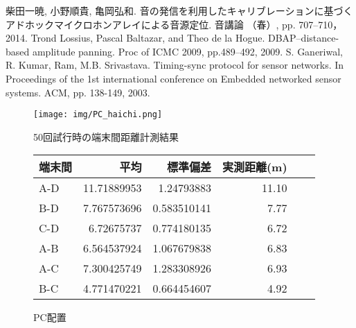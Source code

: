 \documentclass[11pt]{jarticle}
\makeatletter
\newcommand{\tblcaption}[1]{\def\@captype{table}\caption{#1}}
\makeatother
\begin{document}
\begin{thebibliography}{10}

 柴田一暁, 小野順貴, 亀岡弘和. 音の発信を利用したキャリブレーションに基づくアドホックマイクロホンアレイによる音源定位. 音講論 （春）, pp. 707--710，2014.
      Trond Lossius, Pascal Baltazar, and Theo de la Hogue. DBAP–distance-based amplitude panning. Proc of ICMC 2009, pp.489--492, 2009.
      S. Ganeriwal, R. Kumar, Ram, M.B. Srivastava. Timing-sync protocol for sensor networks. In Proceedings of the 1st international conference on Embedded networked sensor systems. ACM,  pp. 138-149, 2003.




\begin{figure}[H]
  \def\@captype{table}
  \begin{minipage}{0.3\hsize}
      \texttt{[image: img/PC\_haichi.png]}
      \caption{PC配置}
      \label{fig:__relpos}
  \end{minipage}
  \hfill
  \begin{minipage}{0.68\hsize}
      \tblcaption{50回試行時の端末間距離計測結果}
      \label{tab:__estdistance}
      \begin{tabular}{l|rrrrr}
        \hline
        {\footnotesize  端末間}&{\footnotesize 平均}&{\footnotesize 標準偏差}&{\footnotesize 実測距離(m) }\\
        \hline
        {\footnotesize A-D }&{\footnotesize 11.71889953}&{\footnotesize 1.24793883}&{\footnotesize 11.10 }\\
        {\footnotesize B-D }&{\footnotesize 7.767573696}&{\footnotesize 0.583510141}&{\footnotesize 7.77 }\\
        {\footnotesize C-D }&{\footnotesize 6.72675737}&{\footnotesize 0.774180135}&{\footnotesize 6.72 }\\
        {\footnotesize A-B }&{\footnotesize 6.564537924}&{\footnotesize 1.067679838}&{\footnotesize 6.83 }\\
        {\footnotesize A-C }&{\footnotesize 7.300425749}&{\footnotesize 1.283308926}&{\footnotesize 6.93 }\\
        {\footnotesize B-C }&{\footnotesize 4.771470221}&{\footnotesize 0.664454607}&{\footnotesize 4.92 }\\
        \hline
      \end{tabular}
  \end{minipage}
\end{figure}



\end{thebibliography}
\end{document}
